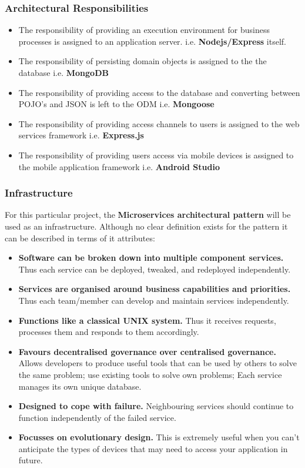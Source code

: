 \documentclass[a4paper,12pt]{article}
\begin{document}
	\subsubsection{Architectural Responsibilities}
	\begin{itemize}
		\item The responsibility of providing an execution environment for business processes is assigned to an application server. i.e. \textbf{Nodejs/Express} itself.
		\item The responsibility of persisting domain objects is assigned to the the database i.e. \textbf{MongoDB}
		\item The responsibility of providing access to the database and converting between POJO's and JSON is left to the ODM i.e. \textbf{Mongoose}
		\item The responsibility of providing access channels to users is assigned to the web services framework i.e. \textbf{Express.js}
		\item The responsibility of providing users access via mobile devices is assigned to the mobile application framework i.e. \textbf{Android Studio}
	\end{itemize}
	
	\subsubsection{Infrastructure}
	For this particular project, the \textbf{Microservices architectural pattern} will be used as an infrastructure. Although no clear definition exists for the pattern it can be described in terms of it attributes:
	\begin{itemize}
		\item \textbf{Software can be broken down into multiple component services.} Thus each service can be deployed, tweaked, and redeployed independently.
		\item \textbf{Services are organised around business capabilities and priorities.} Thus each team/member can develop and maintain services independently.
		\item \textbf{Functions like a classical UNIX system.} Thus it receives requests, processes them and responds to them accordingly.
		\item \textbf{Favours decentralised governance over centralised governance.} Allows developers to produce useful tools that can be used by others to solve the same problem; use existing tools to solve own problems; Each service manages its own unique database.
		\item \textbf{Designed to cope with failure.} Neighbouring services should continue to function independently of the failed service.
		\item \textbf{Focusses on evolutionary design.} This is extremely useful when you can't anticipate the types of devices that may need to access your application in future.
	\end{itemize}
	
\end{document}
